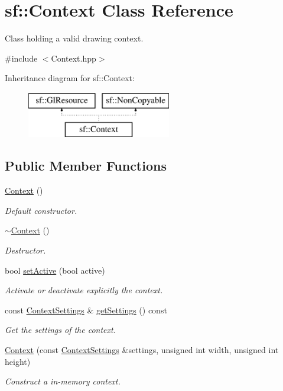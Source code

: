 \hypertarget{classsf_1_1_context}{}\section{sf\+:\+:Context Class Reference}
\label{classsf_1_1_context}


Class holding a valid drawing context.  




{\ttfamily \#include $<$Context.\+hpp$>$}

Inheritance diagram for sf\+:\+:Context\+:\begin{figure}[H]
\begin{center}
\leavevmode
\includegraphics[height=2.000000cm]{classsf_1_1_context}
\end{center}
\end{figure}
\subsection*{Public Member Functions}
\begin{DoxyCompactItemize}
\item 
\hyperlink{classsf_1_1_context_aba22797a790706ca2c5c04ee39f2b555}{Context} ()
\begin{DoxyCompactList}\small\item\em Default constructor. \end{DoxyCompactList}\item 
\hyperlink{classsf_1_1_context_a805b1bbdb3e52b1fda7c9bf2cd6ca86b}{$\sim$\+Context} ()
\begin{DoxyCompactList}\small\item\em Destructor. \end{DoxyCompactList}\item 
bool \hyperlink{classsf_1_1_context_a0806f915ea81ae1f4e8135a7a3696562}{set\+Active} (bool active)
\begin{DoxyCompactList}\small\item\em Activate or deactivate explicitly the context. \end{DoxyCompactList}\item 
const \hyperlink{structsf_1_1_context_settings}{Context\+Settings} \& \hyperlink{classsf_1_1_context_a2cc81c5466553d1901f660d866b4b48b}{get\+Settings} () const
\begin{DoxyCompactList}\small\item\em Get the settings of the context. \end{DoxyCompactList}\item 
\hyperlink{classsf_1_1_context_a2a9e3529e48919120e6b6fc10bad296c}{Context} (const \hyperlink{structsf_1_1_context_settings}{Context\+Settings} \&settings, unsigned int width, unsigned int height)
\begin{DoxyCompactList}\small\item\em Construct a in-\/memory context. \end{DoxyCompactList}\end{DoxyCompactItemize}
